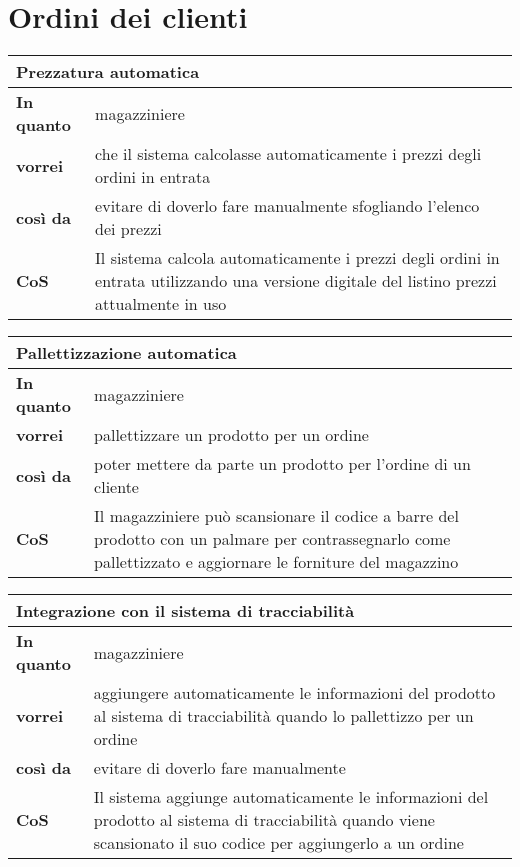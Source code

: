 \section{Ordini dei clienti}

\begin{tabularx}{\textwidth}{lX}
  \toprule
  \multicolumn{2}{l}{\textbf{Prezzatura automatica}} \\
  \midrule
  \textbf{In quanto} & magazziniere \\
  \textbf{vorrei} & che il sistema calcolasse automaticamente i prezzi degli ordini in entrata \\
  \textbf{così da} & evitare di doverlo fare manualmente sfogliando l'elenco dei prezzi \\
  \midrule
  \textbf{CoS} & Il sistema calcola automaticamente i prezzi degli ordini in entrata utilizzando una versione digitale del listino prezzi attualmente in uso \\
  \bottomrule
\end{tabularx}

\begin{tabularx}{\textwidth}{lX}
  \toprule
  \multicolumn{2}{l}{\textbf{Pallettizzazione automatica}} \\
  \midrule
  \textbf{In quanto} & magazziniere \\
  \textbf{vorrei} & pallettizzare un prodotto per un ordine \\
  \textbf{così da} & poter mettere da parte un prodotto per l'ordine di un cliente \\
  \midrule
  \textbf{CoS} & Il magazziniere può scansionare il codice a barre del prodotto con un palmare per contrassegnarlo come pallettizzato e aggiornare le forniture del magazzino \\
  \bottomrule
\end{tabularx}

\begin{tabularx}{\textwidth}{lX}
  \toprule
  \multicolumn{2}{l}{\textbf{Integrazione con il sistema di tracciabilità}} \\
  \midrule
  \textbf{In quanto} & magazziniere \\
  \textbf{vorrei} & aggiungere automaticamente le informazioni del prodotto al sistema di tracciabilità quando lo pallettizzo per un ordine \\
  \textbf{così da} & evitare di doverlo fare manualmente \\
  \midrule
  \textbf{CoS} & Il sistema aggiunge automaticamente le informazioni del prodotto al sistema di tracciabilità quando viene scansionato il suo codice per aggiungerlo a un ordine \\
  \bottomrule
\end{tabularx}


